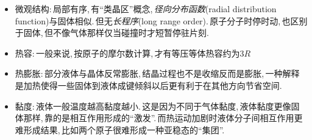 \begin{itemize}
	\item 微观结构:\,局部有序,\,有``类晶区''概念,\,\emph{径向分布函数}(radial distribution function)与固体相似.\,但无\emph{长程序}(long range order).\,原子分子时停时动,\,也区别于固体,\,但不像气体那样仅当碰撞时才短暂停驻片刻.
	\item 热容:\,一般来说,\,按原子的摩尔数计算,\,才有等压等体热容约为$3R$
	\item 热膨胀:\,部分液体与晶体反常膨胀,\,结晶过程也不是收缩反而是膨胀,\,一种解释是加热使得一些固体到液体成键倾斜以后更有利于在其他方向节省空间.
	\item 黏度:\,液体一般温度越高黏度越小.\,这是因为不同于气体黏度,\,液体黏度更像固体那样,\,靠的是相互作用形成的``激发''.\,而热运动加剧时液体分子间相互作用更难形成结果,\,比如两个原子很难形成一种亚稳态的``集团''.
\end{itemize}




